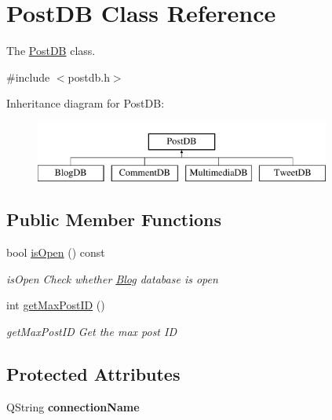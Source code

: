 \hypertarget{classPostDB}{}\section{Post\+DB Class Reference}
\label{classPostDB}


The \hyperlink{classPostDB}{Post\+DB} class.  




{\ttfamily \#include $<$postdb.\+h$>$}

Inheritance diagram for Post\+DB\+:\begin{figure}[H]
\begin{center}
\leavevmode
\includegraphics[height=2.000000cm]{classPostDB}
\end{center}
\end{figure}
\subsection*{Public Member Functions}
\begin{DoxyCompactItemize}
\item 
bool \hyperlink{classPostDB_ad6bb0a1d78d86071a2350eedb1fca732}{is\+Open} () const 
\begin{DoxyCompactList}\small\item\em is\+Open Check whether \hyperlink{classBlog}{Blog} database is open \end{DoxyCompactList}\item 
int \hyperlink{classPostDB_a4dc49af1e34c00afed8265c622d4036d}{get\+Max\+Post\+ID} ()
\begin{DoxyCompactList}\small\item\em get\+Max\+Post\+ID Get the max post ID \end{DoxyCompactList}\end{DoxyCompactItemize}
\subsection*{Protected Attributes}
\begin{DoxyCompactItemize}
\item 
Q\+String {\bfseries connection\+Name}\hypertarget{classPostDB_a49756f95c4b7dff5a8592f1a8a26d609}{}\label{classPostDB_a49756f95c4b7dff5a8592f1a8a26d609}

\end{DoxyCompactItemize}


